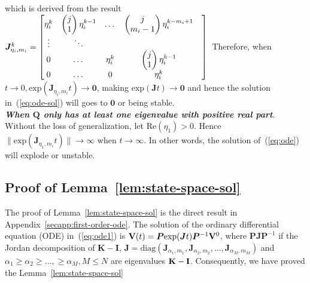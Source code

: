which is derived from the result $\bm{J}^k_{\eta_i, m_i} = \begin{bmatrix}
             \eta_i^{k} & \begin{pmatrix} j\\1 \end{pmatrix}\eta_i^{k - 1} & \dots & \begin{pmatrix} j\\m_i - 1 \end{pmatrix}\eta_i^{k - m_i + 1}\\
            \vdots & \ddots & & &\\
            0&\dots & \eta_i^{k} & \begin{pmatrix} j\\1 \end{pmatrix}\eta_i^{k - 1}\\
            0& \dots & 0 & \eta_i^{k}
    \end{bmatrix}\\$  
Therefore, when $t \rightarrow 0, \mathrm{exp}(\bm{J}_{\eta_i, m_i}t)\rightarrow \bm{0}$, making $\mathrm{exp}(\bm{J}t) \rightarrow \bm{0}$ and hence the solution in~(\ref{eq:ode-sol}) will goes to $\bm{0}$ or being stable.\\
\textit{\textbf{When $\bm{Q}$ only has at least one eigenvalue with positive real part}}. Without the loss of generalization, let $\mathrm{Re}(\eta_1) > 0$. Hence $\| \mathrm{exp}(\bm{J}_{\eta_1, m_i}t) \| \rightarrow \infty$ when $t \rightarrow \infty$. In other words, the solution of~(\ref{eq:ode}) will explode or unstable.
\subsection{Proof of Lemma~\ref{lem:state-space-sol}}
\label{secapp:state-space-sol}
The proof of Lemma~\ref{lem:state-space-sol} is the direct result in Appendix~\ref{secapp:first-order-ode}. The solution of the ordinary differential equation (ODE) in~(\ref{eq:ode1}) is
        ${\mathbf V}(t) = \bm{P}\mathrm{exp}(\bm{J}t)\bm{P}^{-1}{\mathbf V}^0$,
where $\bm{P}\bm{J}\bm{P}^{-1}$ if the Jordan decomposition of $\bm{K} - \bm{I}$, $\bm{J} = \bm{\mathrm{diag}}(\bm{J}_{\alpha_1, m_1}, \bm{J}_{\alpha_2, m_2}, \dots, \bm{J}_{\alpha_M, m_M})$ and $\alpha_1 \geq \alpha_2 \geq \dots, \geq \alpha_M, M \leq N$ are  eigenvalues ${\mathbf K} - {\mathbf I}$. Consequently, we have proved the Lemma~\ref{lem:state-space-sol}
